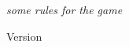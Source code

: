 
  \begin{titlepage}%
    \begin{center}%
      \vspace*{7mm}%
      \klogoHuge%
      \par%
      \vspace*{5mm}%
      \begin{large}{\sl some rules for the game}\end{large}%
      \par
      \vspace*{5cm}%
      \begin{sc}\kdescr\end{sc}
      \par
      \vspace*{5cm}
      {\small Version \kversion}\\
      \begin{small}\kcopylong\end{small}
    \end{center}
  \end{titlepage}


